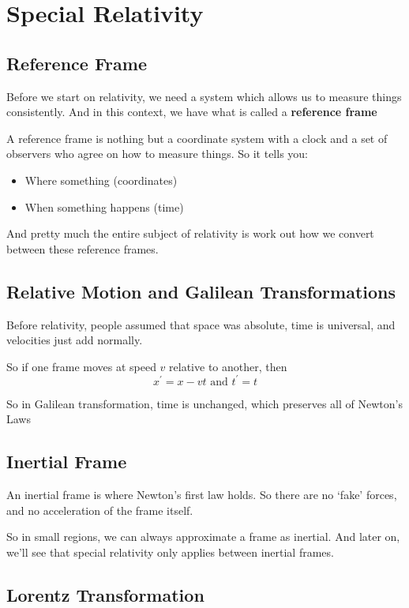 \chapter{Special Relativity}

\section{Reference Frame}

Before we start on relativity, we need a system which allows us to measure things consistently. And in this context, we have what is called a  \textbf{reference frame}

A reference frame is nothing but a coordinate system with a clock and a set of observers who agree on how to measure things. So it tells you: 

\begin{itemize}
    \item Where something (coordinates) 
    \item When something happens (time) 
\end{itemize}

And pretty much the entire subject of relativity is work out how we convert between these reference frames. 

\section{Relative Motion and Galilean Transformations}

Before relativity, people assumed that space was absolute, time is universal, and velocities just add normally. 

So if one frame moves at speed $v$ relative to another, then 
$$
x^\prime = x - vt \text{ and } t^{\prime} = t 
$$

So in Galilean transformation, time is unchanged, which preserves all of Newton's Laws 

\section{Inertial Frame}

An inertial frame is where Newton's first law holds. So there are no `fake' forces, and no acceleration of the frame itself. 

So in small regions, we can always approximate a frame as inertial. And later on, we'll see that special relativity only applies between inertial frames. 

\section{Lorentz Transformation} 

